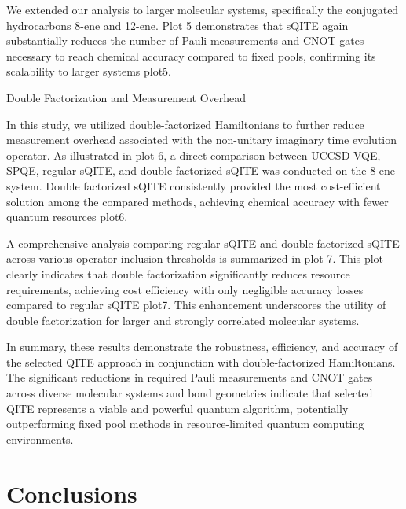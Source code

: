 \documentclass[aip,jcp,amsmath,amssymb, reprint]{revtex4-1}
\begin{document}
We extended our analysis to larger molecular systems, specifically the conjugated hydrocarbons 8-ene and 12-ene. Plot 5 demonstrates that sQITE again substantially reduces the number of Pauli measurements and CNOT gates necessary to reach chemical accuracy compared to fixed pools, confirming its scalability to larger systems {plot5}.


Double Factorization and Measurement Overhead

In this study, we utilized double-factorized Hamiltonians to further reduce measurement overhead associated with the non-unitary imaginary time evolution operator. As illustrated in plot 6, a direct comparison between UCCSD VQE, SPQE, regular sQITE, and double-factorized sQITE was conducted on the 8-ene system. Double factorized sQITE consistently provided the most cost-efficient solution among the compared methods, achieving chemical accuracy with fewer quantum resources {plot6}.

A comprehensive analysis comparing regular sQITE and double-factorized sQITE across various operator inclusion thresholds is summarized in plot 7. This plot clearly indicates that double factorization significantly reduces resource requirements, achieving cost efficiency with only negligible accuracy losses compared to regular sQITE {plot7}. This enhancement underscores the utility of double factorization for larger and strongly correlated molecular systems.

In summary, these results demonstrate the robustness, efficiency, and accuracy of the selected QITE approach in conjunction with double-factorized Hamiltonians. The significant reductions in required Pauli measurements and CNOT gates across diverse molecular systems and bond geometries indicate that selected QITE represents a viable and powerful quantum algorithm, potentially outperforming fixed pool methods in resource-limited quantum computing environments.
\section{Conclusions}


\end{document}
